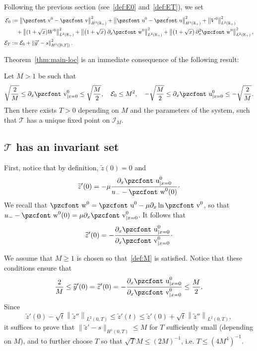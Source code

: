 \documentclass[10pt]{amsart}
\theoremstyle{definition}\newtheorem{defi}[theo]{Definition}\newtheorem{rema}[theo]{Remark}\newtheorem{exam}[theo]{Example}\newtheorem{exem}[theo]{Example}\newtheorem{nota}[theo]{Notation}
\newcommand{\mathpzc}[1]{\text{\pzcfont #1}}
\newcommand{\R}{\mathbb{R}}
\newcommand{\p}{\partial}
\newcommand{\bv}{\bar{\mathpzc{v}}}
\newcommand{\bu}{\bar{\mathpzc{u}}}
\newcommand{\cE}{\mathcal E}
\newcommand{\cT}{\mathcal T}
\newcommand{\cI}{\mathcal I}
\newcommand{\tv}{\mathpzc{v}}
\newcommand{\tu}{\mathpzc{u}}
\newcommand{\tw}{\mathpzc{w}}
\newcommand{\ty}{\widetilde{y}}
\newcommand{\tz}{\widetilde{z}}
\begin{document}
Following the previous section (see~\eqref{def:E0} and~\eqref{def:ET}), we set
\begin{align*}
\cE_0&:=\left\|\tv^0 - \bv\right\|_{H^3(\R_+)}^2 + \left\|\tu^0-\bu\right\|_{H^3(\R_+)}^2 +\left\|V^0\right\|_{L^2(\R_+)}^2 \\
&\quad + \left\|(1+\sqrt{x}) W^0\right\|_{L^2(\R_+)}^2 + \left\|\left(1+\sqrt{x}\right) \p_x\tw^0\right\|_{L^2(\R_+)}^2 + \left\|\left(1+\sqrt{x}\right)\partial_x^2\tw^0\right\|_{L^2(\R_+)}^2,\\
\cE_T&:=\cE_0 + \left\|\ty'-s\right\|_{H^1([0,T])}^2.
\end{align*}



Theorem~\ref{thm:main-loc} is an immediate consequence of the following result:

\begin{prop}\label{prop:fixed-pt}
Let $M > 1$ be such that
\begin{equation}\label{def:M}
\sqrt{\frac{2}{M}}\leq \p_x \tv^0_{|x=0}\leq \sqrt{\frac{M}{2}}, \quad \cE_0\leq M^2, \quad -\sqrt{\frac{M}{2}}\leq \p_x \tu^0_{|x=0}\leq - \sqrt{\frac{2}{M}}.
\end{equation} Then there exists $T > 0$ depending on $M$ and the parameters of the system, such that $\cT$ has a unique fixed point on $\cI_M$.
\end{prop}



\subsection{\texorpdfstring{$\cT$}{T} has an invariant set}



First, notice that by definition, $\tz(0)=0$ and
\[
\tz'(0)= -\mu \frac{ \p_x \tu^0_{|x=0}}{u_- - \tw^0(0)} \cdot
\]
We recall that $\tw^0=\tu^0 - \mu \p_x \ln \tv^0$, so that $u_- - \tw^0(0) = \mu \p_x \tv^0_{|x=0}$. It follows that
\[
\tz'(0)=-\frac{\p_x \tu^0_{|x=0}}{\p_x \tv^0_{|x=0}} \cdot
\]


We assume that $M\geq 1$ is chosen so that~\eqref{def:M} is satisfied. Notice that these conditions ensure that
\[
\frac{2}{M}
\leq \ty'(0) = \tz'(0) = - \frac{\p_x \tu^0_{|x=0}}{\p_x \tv^0_{|x=0}}\leq \frac{M}{2}.
\]
Since
\[
\tz'(0) - \sqrt{t}\left\|\tz''\right\|_{L^2(0,T)}\leq \tz'(t)\leq \tz'(0) + \sqrt{t}\left\|\tz''\right\|_{L^2(0,T)},
\]
it suffices to prove that $\|\tz'-s\|_{H^1(0,T)}\leq M$ for $T$ sufficiently small (depending on $M$), and to further choose $T$ so that $\sqrt{T} M \leq (2M)^{-1}$, i.e. $T \leq (4 M^4)^{-1}.$
\end{document}
